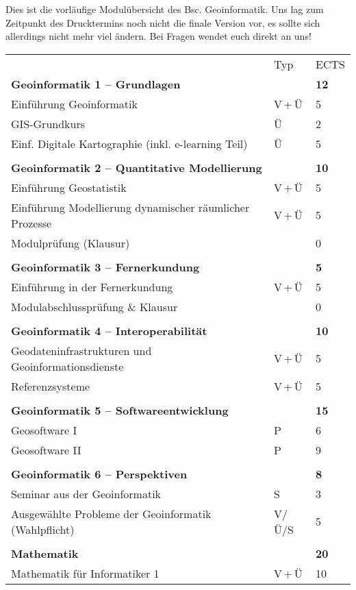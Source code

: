 Dies ist die vorläufige Modulübersicht des Bsc. Geoinformatik. Uns lag zum Zeitpunkt des Drucktermins noch nicht die finale Version vor, es sollte sich allerdings nicht mehr viel ändern. Bei Fragen wendet euch direkt an uns!

\begin{longtable}{p{} p{} p{}}
 & Typ & ECTS \\ 
\textbf{Geoinformatik 1 -- Grundlagen} & & \textbf{12}\\ 
Einführung Geoinformatik & V\,+\,Ü & 5\\
GIS-Grundkurs & Ü & 2\\
Einf. Digitale Kartographie (inkl. e-learning Teil) & Ü & 5\\
& &\\
\textbf{Geoinformatik 2 -- Quantitative Modellierung} & & \textbf{10}\\
Einführung Geostatistik & V\,+\,Ü & 5\\
Einführung Modellierung dynamischer räumlicher Prozesse & V\,+\,Ü & 5\\
Modulprüfung (Klausur) & & 0\\
& &\\
\textbf{Geoinformatik 3 -- Fernerkundung} & & \textbf{5}\\
Einführung in der Fernerkundung & V\,+\,Ü & 5\\
Modulabschlussprüfung \& Klausur & & 0\\
&&\\
\textbf{Geoinformatik 4 -- Interoperabilität} & &\textbf{10}\\
Geodateninfrastrukturen und Geoinformationsdienste & V\,+\,Ü & 5 \\
Referenzsysteme &V\,+\,Ü & 5\\
&&\\
\textbf{Geoinformatik 5 -- Softwareentwicklung} && \textbf{15}\\
Geosoftware I & P & 6\\
Geosoftware II & P & 9\\
&&\\
\textbf{Geoinformatik 6 -- Perspektiven}&& \textbf{8}\\
Seminar aus der Geoinformatik & S & 3\\
Ausgewählte Probleme der Geoinformatik (Wahlpflicht) & V/Ü/S & 5\\
&&\\
\textbf{Mathematik}&& \textbf{20}\\
Mathematik für Informatiker 1& V\,+\,Ü & 10\\

\end{longtable}

